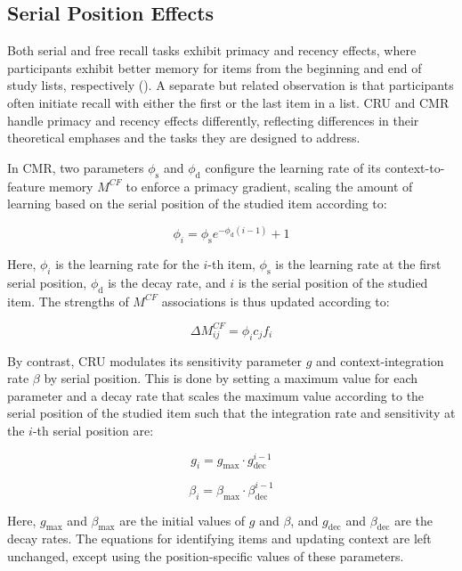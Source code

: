 \documentclass[
  man,
  floatsintext,
  longtable,
  nolmodern,
  notxfonts,
  notimes,
  draftfirst,
  colorlinks=true,linkcolor=blue,citecolor=blue,urlcolor=blue]{apa7}
\begin{document}
\subsection{Serial Position Effects}\label{serial-position-effects}

Both serial and free recall tasks exhibit primacy and recency effects,
where participants exhibit better memory for items from the beginning
and end of study lists, respectively
(). A separate but
related observation is that participants often initiate recall with
either the first or the last item in a list. CRU and CMR handle primacy
and recency effects differently, reflecting differences in their
theoretical emphases and the tasks they are designed to address.

In CMR, two parameters \(\phi_\text{s}\) and \(\phi_\text{d}\) configure
the learning rate of its context-to-feature memory \(M^{CF}\) to enforce
a primacy gradient, scaling the amount of learning based on the serial
position of the studied item according to:

\[ 
\phi_i = \phi_\text{s} e^{-\phi_\text{d}(i-1)} + 1
\]

Here, \(\phi_i\) is the learning rate for the \(i\)-th item,
\(\phi_\text{s}\) is the learning rate at the first serial position,
\(\phi_\text{d}\) is the decay rate, and \(i\) is the serial position of
the studied item. The strengths of \(M^{CF}\) associations is thus
updated according to:

\[
\Delta M^{CF}_{ij} = \phi_i c_j f_i 
\]

By contrast, CRU modulates its sensitivity parameter \(g\) and
context-integration rate \(\beta\) by serial position. This is done by
setting a maximum value for each parameter and a decay rate that scales
the maximum value according to the serial position of the studied item
such that the integration rate and sensitivity at the \(i\)-th serial
position are:

\[g_i = g_\text{max} \cdot g^{i-1}_\text{dec}\]

\[\beta_i = \beta_\text{max} \cdot \beta^{i-1}_\text{dec}\]

Here, \(g_\text{max}\) and \(\beta_\text{max}\) are the initial values
of \(g\) and \(\beta\), and \(g_\text{dec}\) and \(\beta_\text{dec}\)
are the decay rates. The equations for identifying items and updating
context are left unchanged, except using the position-specific values of
these parameters.
\end{document}
